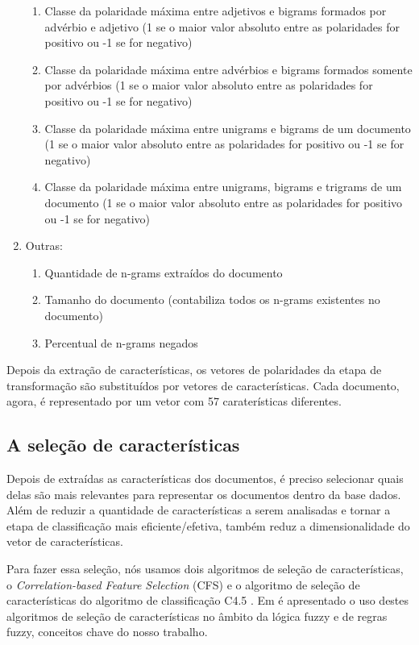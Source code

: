 \documentclass[template.tex]{subfiles}
\begin{document}
\begin{enumerate}
\begin{enumerate}
	\item Classe da polaridade máxima entre adjetivos e bigrams formados por advérbio e adjetivo (1 se o maior valor absoluto entre as polaridades for positivo ou -1 se for negativo)
	\item Classe da polaridade máxima entre advérbios e bigrams formados somente por advérbios (1 se o maior valor absoluto entre as polaridades for positivo ou -1 se for negativo)
	\item Classe da polaridade máxima entre unigrams e bigrams de um documento (1 se o maior valor absoluto entre as polaridades for positivo ou -1 se for negativo)
	\item Classe da polaridade máxima entre unigrams, bigrams e trigrams de um documento (1 se o maior valor absoluto entre as polaridades for positivo ou -1 se for negativo)
  \end{enumerate}
  \item Outras:
  \begin{enumerate}
  	\item Quantidade de n-grams extraídos do documento
	\item Tamanho do documento (contabiliza todos os n-grams existentes no documento)
	\item Percentual de n-grams negados
  \end{enumerate}
\end{enumerate}

Depois da extração de características, os vetores de polaridades da etapa de transformação são substituídos por vetores de características. Cada documento, agora, é representado por um vetor com 57 caraterísticas diferentes. 

\subsection{A seleção de características}

Depois de extraídas as características dos documentos, é preciso selecionar quais delas são mais relevantes para representar os documentos dentro da base dados. Além de reduzir a quantidade de características a serem analisadas e tornar a etapa de classificação mais eficiente/efetiva, também reduz a dimensionalidade do vetor de características. 

Para fazer essa seleção, nós usamos dois algoritmos de seleção de características, o \textit{Correlation-based Feature Selection} (CFS) e o algoritmo de seleção de características do algoritmo de classificação C4.5 \cite{cintra2008fuzzy}. Em  é apresentado o uso destes algoritmos de seleção de características no âmbito da lógica fuzzy e de regras fuzzy, conceitos chave do nosso trabalho. 
\end{document}
